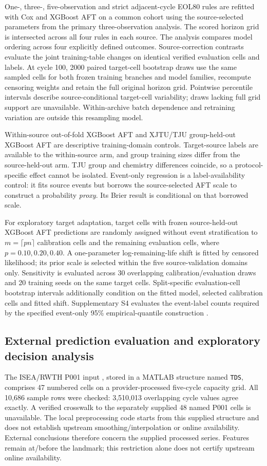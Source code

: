 \documentclass[preprint,12pt]{elsarticle}
\begin{document}
One-, three-, five-observation and strict adjacent-cycle EOL80 rules are refitted with Cox and XGBoost AFT on a common cohort using the source-selected parameters from the primary three-observation analysis. The scored horizon grid is intersected across all four rules in each source. The analysis compares model ordering across four explicitly defined outcomes. Source-correction contrasts evaluate the joint training-table changes on identical verified evaluation cells and labels. At cycle 100, 2000 paired target-cell bootstrap draws use the same sampled cells for both frozen training branches and model families, recompute censoring weights and retain the full original horizon grid. Pointwise percentile intervals describe source-conditional target-cell variability; draws lacking full grid support are unavailable. Within-archive batch dependence and retraining variation are outside this resampling model.

Within-source out-of-fold XGBoost AFT and XJTU/TJU group-held-out XGBoost AFT are descriptive training-domain controls. Target-source labels are available to the within-source arm, and group training sizes differ from the source-held-out arm. TJU group and chemistry differences coincide, so a protocol-specific effect cannot be isolated. Event-only regression is a label-availability control: it fits source events but borrows the source-selected AFT scale to construct a probability \emph{proxy}. Its Brier result is conditional on that borrowed scale.

For exploratory target adaptation, target cells with frozen source-held-out XGBoost AFT predictions are randomly assigned without event stratification to $m=\lceil pn\rceil$ calibration cells and the remaining evaluation cells, where $p=0.10,0.20,0.40$. A one-parameter log-remaining-life shift is fitted by censored likelihood; its prior scale is selected within the five source-validation domains only. Sensitivity is evaluated across 30 overlapping calibration/evaluation draws and 20 training seeds on the same target cells. Split-specific evaluation-cell bootstrap intervals additionally condition on the fitted model, selected calibration cells and fitted shift. Supplementary S4 evaluates the event-label counts required by the specified event-only 95\% empirical-quantile construction \citep{angelopoulos2021}.

\subsection{External prediction evaluation and exploratory decision analysis}
The ISEA/RWTH P001 input \citep{isea2021}, stored in a MATLAB structure named \texttt{TDS}, comprises 47 numbered cells on a provider-processed five-cycle capacity grid. All 10,686 sample rows were checked: 3,510,013 overlapping cycle values agree exactly. A verified crosswalk to the separately supplied 48 named P001 cells is unavailable. The local preprocessing code starts from this supplied structure and does not establish upstream smoothing/interpolation or online availability. External conclusions therefore concern the supplied processed series. Features remain at/before the landmark; this restriction alone does not certify upstream online availability.
\end{document}
